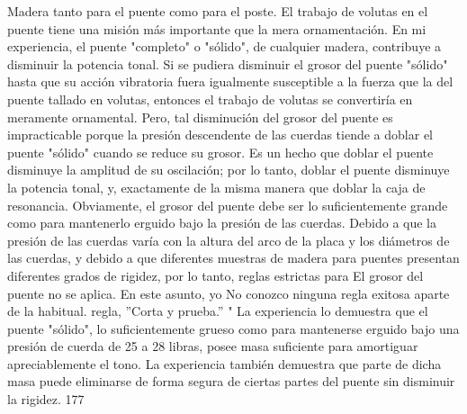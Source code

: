 Madera tanto para el puente como para el poste.
El trabajo de volutas en el puente tiene una misión más importante que la mera ornamentación. En mi experiencia, el puente "completo" o "sólido", de cualquier madera, contribuye a disminuir la potencia tonal. Si se pudiera disminuir el grosor del puente "sólido" hasta que su acción vibratoria fuera igualmente susceptible a la fuerza que la del puente tallado en volutas, entonces el trabajo de volutas se convertiría en meramente ornamental. Pero, tal disminución del grosor del puente es impracticable porque la presión descendente de las cuerdas tiende a doblar el puente "sólido" cuando se reduce su grosor. Es un hecho que doblar el puente disminuye la amplitud de su oscilación; por lo tanto, doblar el puente disminuye la potencia tonal, y, exactamente de la misma manera que doblar la caja de resonancia. Obviamente, el grosor del puente debe ser lo suficientemente grande como para mantenerlo erguido bajo la presión de las cuerdas. Debido a que la presión de las cuerdas varía con la altura del arco de la placa y los diámetros de las cuerdas, y debido a que diferentes muestras de madera para puentes presentan diferentes grados de rigidez, por lo tanto, reglas estrictas para
El grosor del puente no se aplica.	En este asunto, yo
No conozco ninguna regla exitosa aparte de la habitual.	
regla,	''Corta y prueba.''
"
La experiencia lo demuestra
que el puente "sólido", lo suficientemente grueso como para mantenerse erguido bajo una presión de cuerda de 25 a 28 libras, posee masa suficiente para amortiguar apreciablemente el tono. La experiencia también demuestra que parte de dicha masa puede eliminarse de forma segura de ciertas partes del puente sin disminuir la rigidez.
177

